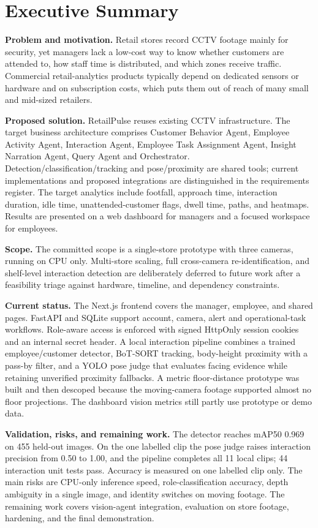 \chapter*{Executive Summary}
\textbf{Problem and motivation.} Retail stores record CCTV footage mainly for security, yet managers lack a low-cost way to know whether customers are attended to, how staff time is distributed, and which zones receive traffic. Commercial retail-analytics products typically depend on dedicated sensors or hardware and on subscription costs, which puts them out of reach of many small and mid-sized retailers.

\textbf{Proposed solution.} RetailPulse reuses existing CCTV infrastructure. The target business architecture comprises Customer Behavior Agent, Employee Activity Agent, Interaction Agent, Employee Task Assignment Agent, Insight Narration Agent, Query Agent and Orchestrator. Detection/classification/tracking and pose/proximity are shared tools; current implementations and proposed integrations are distinguished in the requirements register. The target analytics include footfall, approach time, interaction duration, idle time, unattended-customer flags, dwell time, paths, and heatmaps. Results are presented on a web dashboard for managers and a focused workspace for employees.

\textbf{Scope.} The committed scope is a single-store prototype with three cameras, running on CPU only. Multi-store scaling, full cross-camera re-identification, and shelf-level interaction detection are deliberately deferred to future work after a feasibility triage against hardware, timeline, and dependency constraints.

\textbf{Current status.} The Next.js frontend covers the manager, employee, and shared pages. FastAPI and SQLite support account, camera, alert and operational-task workflows. Role-aware access is enforced with signed HttpOnly session cookies and an internal secret header. A local interaction pipeline combines a trained employee/customer detector, BoT-SORT tracking, body-height proximity with a pass-by filter, and a YOLO pose judge that evaluates facing evidence while retaining unverified proximity fallbacks. A metric floor-distance prototype was built and then descoped because the moving-camera footage supported almost no floor projections. The dashboard vision metrics still partly use prototype or demo data.

\textbf{Validation, risks, and remaining work.} The detector reaches mAP50 0.969 on 455 held-out images. On the one labelled clip the pose judge raises interaction precision from 0.50 to 1.00, and the pipeline completes all 11 local clips; 44 interaction unit tests pass. Accuracy is measured on one labelled clip only. The main risks are CPU-only inference speed, role-classification accuracy, depth ambiguity in a single image, and identity switches on moving footage. The remaining work covers vision-agent integration, evaluation on store footage, hardening, and the final demonstration.
